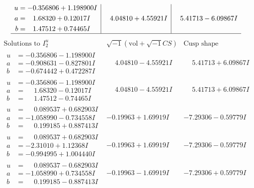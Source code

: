 \documentclass[1p]{elsarticle_modified}
\theoremstyle{definition}
\newcommand{\I}{\sqrt{-1}}
\begin{document}
$$\begin{array}{c|c|c}
\begin{aligned}
u &= -0.356806 + 1.198900 I \\
a &= \phantom{-}1.68320 + 0.12017 I \\
b &= \phantom{-}1.47512 + 0.74465 I\end{aligned}
 & \phantom{-}4.04810 + 4.55921 I & \phantom{-}5.41713 - 6.09867 I\\
 \hline 
 \end{array}$$\newpage$$\begin{array}{c|c|c}  
\text{Solutions to }I^u_{2}& \I (\text{vol} + \sqrt{-1}CS) & \text{Cusp shape}\\
 \hline 
\begin{aligned}
u &= -0.356806 - 1.198900 I \\
a &= -0.908631 - 0.827801 I \\
b &= -0.674442 + 0.472287 I\end{aligned}
 & \phantom{-}4.04810 - 4.55921 I & \phantom{-}5.41713 + 6.09867 I \\ \hline\begin{aligned}
u &= -0.356806 - 1.198900 I \\
a &= \phantom{-}1.68320 - 0.12017 I \\
b &= \phantom{-}1.47512 - 0.74465 I\end{aligned}
 & \phantom{-}4.04810 - 4.55921 I & \phantom{-}5.41713 + 6.09867 I \\ \hline\begin{aligned}
u &= \phantom{-}0.089537 + 0.682903 I \\
a &= -1.058990 - 0.734558 I \\
b &= \phantom{-}0.199185 + 0.887413 I\end{aligned}
 & -0.19963 + 1.69919 I & -7.29306 - 0.59779 I \\ \hline\begin{aligned}
u &= \phantom{-}0.089537 + 0.682903 I \\
a &= -2.31010 + 1.12368 I \\
b &= -0.994995 + 1.004440 I\end{aligned}
 & -0.19963 + 1.69919 I & -7.29306 - 0.59779 I \\ \hline\begin{aligned}
u &= \phantom{-}0.089537 - 0.682903 I \\
a &= -1.058990 + 0.734558 I \\
b &= \phantom{-}0.199185 - 0.887413 I\end{aligned}
 & -0.19963 - 1.69919 I & -7.29306 + 0.59779 I \\ \hline\begin{aligned}

\end{aligned}
\end{array}$$
\end{document}
